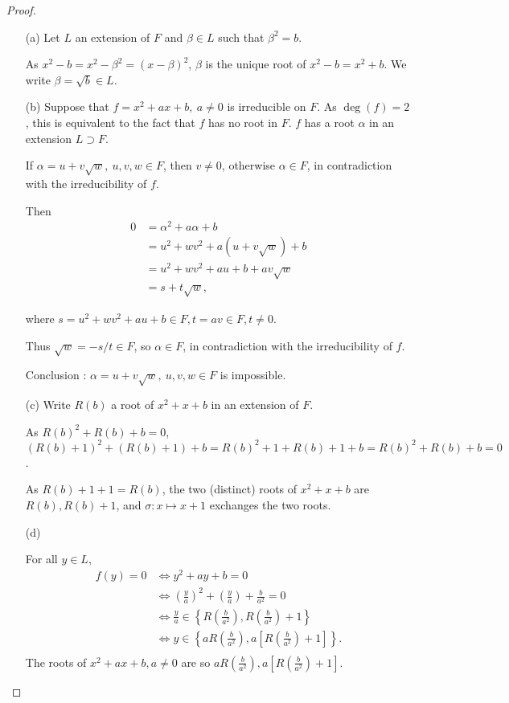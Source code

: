 \documentclass[11pt,a4paper]{article}
\begin{document}
\begin{proof}
\begin{enumerate}
\item[(a)]
Let $L$ an extension of $F$ and $\beta \in L$ such that $\beta^2 = b$.

As $x^2 - b = x^2 - \beta^2 = (x - \beta)^2$, $\beta$ is the unique root of $x^2-b = x^2+b$. We write $\beta = \sqrt{b} \in L$.

\item[(b)]
Suppose that  $f = x^2+ax+b, \ a\ne 0$ is irreducible on $F$. As $\deg(f) = 2$, this is equivalent to the fact that $f$ has no root in $F$.
 $f $ has a root $\alpha$ in an extension $L \supset F$.
 
If $\alpha = u+v\sqrt{w},\ u,v,w \in F$, then $v\neq 0$, otherwise $\alpha \in F$, in contradiction with the irreducibility of $f$.
 
 Then
 \begin{align*}
 0&= \alpha^2 + a \alpha + b\\
 &= u^2+wv^2 + a(u+v \sqrt{w})+ b\\
 &= u^2+wv^2+au+b + av \sqrt{w}\\
 &=s + t \sqrt{w},
 \end{align*}
 
where $s = u^2+wv^2+au+b  \in F, t = av \in F, t\neq 0$.

Thus $\sqrt{w} = -s/t \in F$, so $\alpha \in F$, in contradiction with the irreducibility of $f$.

Conclusion : $\alpha = u+v\sqrt{w},\ u,v,w \in F$ is impossible.

\item[(c)]
Write $R(b)$ a root of $x^2+x+b$ in an extension of $F$.

As $R(b)^2+R(b)+b=0$, $(R(b)+1)^2 + (R(b) +1)+b = R(b)^2+1 + R(b)+1+b = R(b)^2+R(b)+b=0$.

As $R(b)+1+1 = R(b)$, the two (distinct) roots of  $x^2+x+b$ are $R(b),R(b)+1$, and  $\sigma : x\mapsto x+1$ exchanges the two roots.

\item[(d)]

For all $y \in L$,
\begin{align*}
f(y) =0 &\iff y^2+ay+b=0\\
&\iff \left(\frac{y}{a}\right ) ^2 + \left(\frac{y}{a}\right ) + \frac{b}{a^2} = 0\\
&\iff \frac{y}{a} \in \left \{R \left(\frac{b}{a^2}\right ) , R \left(\frac{b}{a^2}\right ) +1 \right \}\\
&\iff y \in \left \{aR \left(\frac{b}{a^2}\right ) , a\left [R \left(\frac{b}{a^2}\right ) +1\right] \right \}.\\
\end{align*}
The roots of $x^2+ax+b,a\neq 0$ are so $aR \left(\frac{b}{a^2}\right ) , a\left [R \left(\frac{b}{a^2}\right ) +1\right] $.
\end{enumerate}
\end{proof}
\end{document}
